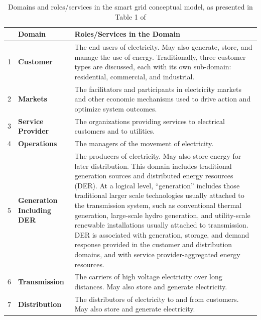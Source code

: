\begin{table}[t]
    \centering
 
    \begin{tabular}{|p{0.3cm}|p{2.2cm}|p{9.1cm}|}
   \hline

 &\textbf{Domain} & \textbf{Roles/Services in the Domain} \\ \hline
 
1 & \textbf{Customer} & The end users of electricity. May also generate, store, and manage the use of energy. Traditionally, three customer types are discussed, each with its own sub-domain: residential, commercial, and industrial. \\ \hline
2 & \textbf{Markets} & The facilitators and participants in electricity markets and other economic mechanisms used to drive action and optimize system outcomes. \\ \hline
3 & \textbf{Service Provider} & The organizations providing services to electrical customers and to utilities. \\ \hline
4 & \textbf{Operations} & The managers of the movement of electricity. \\ \hline
5 & \textbf{Generation Including DER} & The producers of electricity. May also store energy for later distribution. This domain includes traditional generation sources and distributed energy resources (DER). At a logical level, “generation” includes those traditional larger scale technologies usually attached to the transmission system, such as conventional thermal generation, large-scale hydro generation, and utility-scale renewable installations usually attached to transmission. DER is associated with generation, storage, and demand response provided in the customer and distribution domains, and with service provider-aggregated energy resources. \\ \hline
6 & \textbf{Transmission} & The carriers of high voltage electricity over long distances. May also store and generate electricity. \\ \hline
7 & \textbf{Distribution} & The distributors of electricity to and from customers. May also store and generate electricity.\\
    \hline


    
    \end{tabular}

    \caption[Domains and roles/services in the smart grid conceptual model]{Domains and roles/services in the smart grid conceptual model, as presented in Table 1 of \cite{gopstein2021nist}}
    \label{tab:nist-domains}
\end{table}


